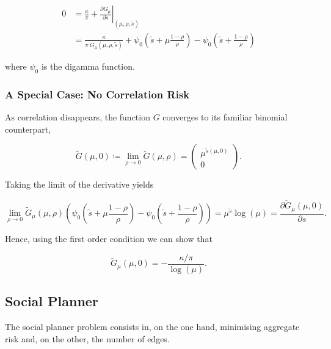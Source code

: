 \documentclass[american, abstract=on]{scrartcl}
\theoremstyle{plain}
\begin{document}
\begin{equation}
  \begin{split}
    0 &= \frac{\kappa}{\pi} + \left. \frac{\partial G_\mu}{\partial s} \right\vert_{(\mu, \rho, \tilde{s})}  \\
    &= \frac{\kappa}{\pi \ G_\mu(\mu, \rho, \tilde{s})} + \psi_0\left(\tilde{s} + \mu \frac{1 - \rho}{\rho} \right) - \psi_0\left(\tilde{s} + \frac{1 - \rho}{\rho} \right)  
  \end{split}
\end{equation}

where $\psi_0$ is the digamma function.

\subsubsection{A Special Case: No Correlation Risk}

As correlation disappears, the function $G$ converges to its familiar binomial counterpart,

\begin{equation}
  \tilde{G}(\mu, 0) \coloneqq \lim_{\rho \rightarrow 0} \tilde{G}(\mu, \rho) = \begin{pmatrix} \mu^{\tilde{s}(\mu, 0)} \\ 0 \end{pmatrix}.
\end{equation}

Taking the limit of the derivative yields

\begin{equation}
  \lim_{\rho \rightarrow 0}\tilde{G}_\mu(\mu, \rho) \left(\psi_0\left(\tilde{s} + \mu \frac{1 - \rho}{\rho} \right) - \psi_0\left(\tilde{s} + \frac{1 - \rho}{\rho} \right) \right) = \mu^{\tilde{s}} \log(\mu) = \frac{\partial \tilde{G}_{\mu}(\mu, 0)}{\partial s}.
\end{equation}

Hence, using the first order condition we can show that

\begin{equation}
  \tilde{G}_{\mu}(\mu, 0) = -\frac{\kappa / \pi}{\log(\mu)}.
\end{equation}

\subsection{Social Planner}

The social planner problem consists in, on the one hand, minimising aggregate risk and, on the other, the number of edges. 
\end{document}

